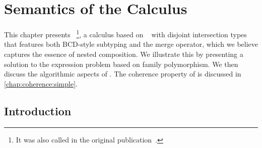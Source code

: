 
\chapter{Semantics of the \namee Calculus}
\label{chap:nested}

This chapter presents \namee~\footnote{It was also called \name in the original publication~\citep{bi_et_al:LIPIcs:2018:9227}.}, a calculus based on \oname~\citep{oliveira2016disjoint} with disjoint intersection types that
features both BCD-style subtyping and the merge operator, which we believe
captures the essence of nested composition. We illustrate this by presenting a
solution to the expression problem based on family polymorphism. We then discuss
the algorithmic aspects of \namee. The coherence property of \namee is discussed
in \cref{chap:coherence:simple}.

\section{Introduction}

